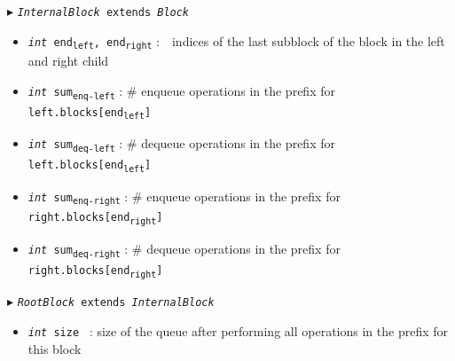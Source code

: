 \documentclass[10pt]{article}
\newcommand{\sub}[1]{\textsubscript{#1}}
\renewcommand{\tt}[1]{\texttt{#1}}
\renewcommand{\sl}[1]{\textsl{#1}}
\newcommand{\size}{size }
\theoremstyle{definition}
\begin{document}
\begin{algorithm}
\begin{algorithmic}[1]
\begin{multicols}{2}
\Statex $\blacktriangleright$ \tt{\sl{InternalBlock} extends \sl{Block}}
\begin{itemize}
    \item \tt{\sl{int} end\sub{left}, end\sub{right}}
  \textsf{:~~indices of the last subblock of the block in the left and right child}
  \item \tt{\sl{int} sum\sub{enq-left}}
  \textsf{: \# enqueue operations in the prefix for \tt{left.blocks[end\sub{left}]}}
  \item \tt{\sl{int} sum\sub{deq-left}}
  \textsf{: \# dequeue operations in the prefix for \tt{left.blocks[end\sub{left}]}}
  \item \tt{\sl{int} sum\sub{enq-right}}
  \textsf{: \# enqueue operations in the prefix for \tt{right.blocks[end\sub{right}]}}
  \item \tt{\sl{int} sum\sub{deq-right}}
  \textsf{: \# dequeue operations in the prefix for \tt{right.blocks[end\sub{right}]}}
\end{itemize}


\Statex $\blacktriangleright$ \tt{\sl{RootBlock} extends \sl{InternalBlock}}
\begin{itemize}
  \item \tt{\sl{int} \size}
  \textsf{: size of the queue after performing all operations in the prefix for this block}
\end{itemize}



\end{multicols}
\end{algorithmic}
\end{algorithm}
\end{document}
